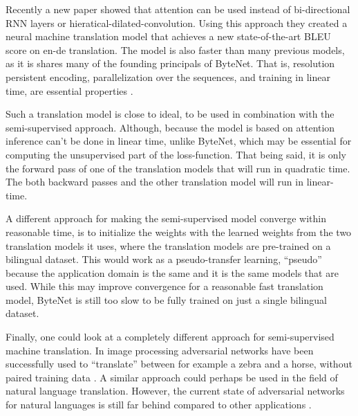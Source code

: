 Recently a new paper showed that attention can be used instead of bi-directional RNN layers or hieratical-dilated-convolution. Using this approach they created a neural machine translation model that achieves a new state-of-the-art BLEU score on en-de translation. The model is also faster than many previous models, as it is shares many of the founding principals of ByteNet. That is, resolution persistent encoding, parallelization over the sequences, and training in linear time, are essential properties \cite{attention-is-all-you-need}.

Such a translation model is close to ideal, to be used in combination with the semi-supervised approach. Although, because the model is based on attention inference can't be done in linear time, unlike ByteNet, which may be essential for computing the unsupervised part of the loss-function. That being said, it is only the forward pass of one of the translation models that will run in quadratic time. The both backward passes and the other translation model will run in linear-time.

A different approach for making the semi-supervised model converge within reasonable time, is to initialize the weights with the learned weights from the two translation models it uses, where the translation models are pre-trained on a bilingual dataset. This would work as a pseudo-transfer learning, ``pseudo'' because the application domain is the same and it is the same models that are used. While this may improve convergence for a reasonable fast translation model, ByteNet is still too slow to be fully trained on just a single bilingual dataset.

Finally, one could look at a completely different approach for semi-supervised machine translation. In image processing adversarial networks have been successfully used to ``translate'' between for example a zebra and a horse, without paired training data \cite{gan-image-translation}. A similar approach could perhaps be used in the field of natural language translation. However, the current state of adversarial networks for natural languages is still far behind compared to other applications \cite{gan-on-nlp}.